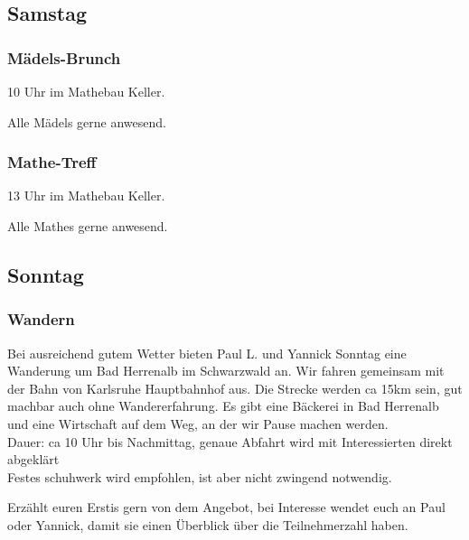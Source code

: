 \documentclass[10pt,ngerman]{scrartcl}
\begin{document}
\begin{multicols}{2}
\subsection{Samstag}

\subsubsection{Mädels-Brunch}

10 Uhr im Mathebau Keller.

Alle Mädels gerne anwesend.

\subsubsection{Mathe-Treff}

13 Uhr im Mathebau Keller.

Alle Mathes gerne anwesend.

\subsection{Sonntag}

\subsubsection{Wandern}

Bei ausreichend gutem Wetter bieten Paul L. und Yannick Sonntag eine Wanderung um Bad Herrenalb im Schwarzwald an.
Wir fahren gemeinsam mit der Bahn von Karlsruhe Hauptbahnhof aus.
Die Strecke werden ca 15km sein, gut machbar auch ohne Wandererfahrung.
Es gibt eine Bäckerei in Bad Herrenalb und eine Wirtschaft auf dem Weg, an der wir Pause machen werden. \\
Dauer: ca 10 Uhr bis Nachmittag, genaue Abfahrt wird mit Interessierten direkt abgeklärt \\
Festes schuhwerk wird empfohlen, ist aber nicht zwingend notwendig.

Erzählt euren Erstis gern von dem Angebot, bei Interesse wendet euch an Paul oder Yannick, damit sie einen Überblick über die Teilnehmerzahl haben.

\end{multicols}
\label{LastPage}
\end{document}
